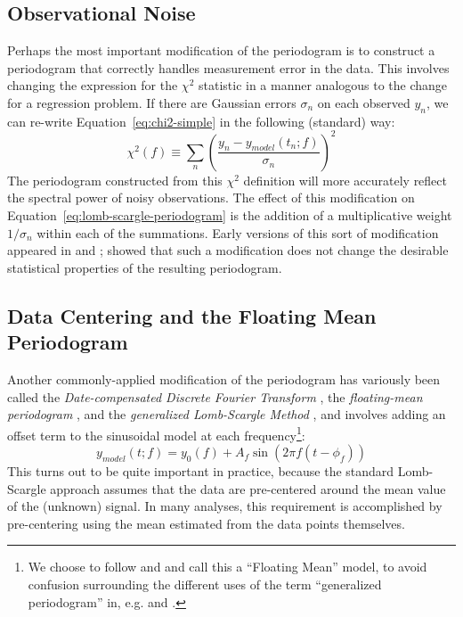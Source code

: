 \documentclass[preprint]{aastex}
\newcommand{\Eq}[1]{Equation~\ref{eq:#1}}
\newcommand{\eq}[1]{\Eq{#1}}
\newcommand{\eqlabel}[1]{\label{eq:#1}}
\newcommand{\sectlabel}[1]{\label{sect:#1}}
\begin{document}
\subsection{Observational Noise}
\sectlabel{extensions-observational-noise}
Perhaps the most important modification of the periodogram is to
construct a periodogram that correctly handles measurement error in the data.
This involves changing the expression for the $\chi^2$ statistic in a manner
analogous to the change for a regression problem.
If there are Gaussian errors $\sigma_n$ on each observed $y_n$, we can re-write \eq{chi2-simple} in the following (standard) way:
\begin{equation}
  \chi^2(f) \equiv \sum_n \left(\frac{y_n - y_{model}(t_n;f)}{\sigma_n}\right)^2
  \eqlabel{chi2-with-errors}
\end{equation}
The periodogram constructed from this $\chi^2$ definition will more accurately
reflect the spectral power of noisy observations.
The effect of this modification on \eq{lomb-scargle-periodogram} is the addition
of a multiplicative weight $1/\sigma_n$ within each of the summations.
Early versions of this sort of modification appeared in \citet{Gilliland87}
and \citet{Irwin89}; \citet{Zechmeister09} showed that such a modification
does not change the desirable statistical properties of the resulting
periodogram.


\subsection{Data Centering and the Floating Mean Periodogram}
\sectlabel{floating-mean}

Another commonly-applied modification of the periodogram has variously been
called the {\it Date-compensated Discrete Fourier Transform} \citep{Ferraz-Mello81}, the {\it floating-mean periodogram} \citep{Cumming99}, and the {\it generalized Lomb-Scargle Method} \citep{Zechmeister09}, and involves adding an offset term to the sinusoidal model at each frequency\footnote{We choose to follow \citet{Cumming99} and \citet{VanderPlas2015} and call this a ``Floating Mean'' model, to avoid confusion surrounding the different uses of the term ``generalized periodogram'' in, {e.g.} \citet{Bretthorst88} and \citet{Zechmeister09}.}:
\begin{equation}
  y_{model}(t;f) = y_0(f) + A_f \sin(2 \pi f (t - \phi_f))
  \eqlabel{floating-mean-model}
\end{equation}
This turns out to be quite important in practice, because the standard
Lomb-Scargle approach assumes that the
data are pre-centered around the mean value of the (unknown) signal.
In many analyses, this requirement is accomplished by pre-centering using
the mean estimated from the data points themselves.
\end{document}
